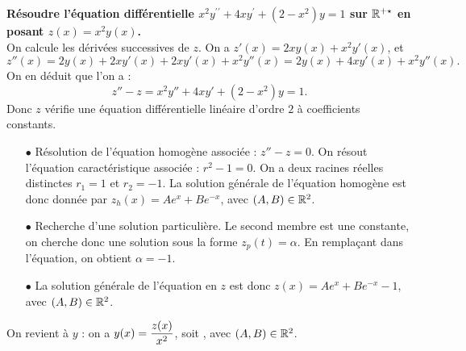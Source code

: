 \documentclass[a4paper, 11pt,reqno]{article}
\begin{document}
\begin{correction}  \;
\textbf{R\'esoudre l'\'equation diff\'erentielle $x^2y^{\prime\prime}+4xy^{\prime}+(2-x^2)y=1$ sur $\mathbb{R}^{+\star}$ en posant $z(x)=x^2y(x)$.}\\
On calcule les d\'eriv\'ees successives de $z$. On a $z'(x) = 2x y(x) + x^2 y'(x)$, et 
$$z''(x) = 2 y(x) + 2x y'(x) + 2x y'(x) + x^2 y''(x) = 2 y(x) + 4x y'(x) + x^2y''(x).$$ 
On en d\'eduit que l'on a :
$$z''-z =  x^2 y'' +4x y' + (2-x^2)y = 1.$$
Donc $z$ v\'erifie une \'equation diff\'erentielle lin\'eaire d'ordre $2$ \`a coefficients constants.
\begin{itemize}
\item[$\bullet$] R\'esolution de l'\'equation homog\`ene associ\'ee : $z''-z =0$. On r\'esout l'\'equation caract\'eristique associ\'ee : $r^2-1=0$. On a deux racines r\'eelles distinctes $r_1=1$ et $r_2=-1$. La solution g\'en\'erale de l'\'equation homog\`ene est donc donn\'ee par $z_h(x) = Ae^{x} + B e^{-x}$, avec $(A,B) \in \mathbb{R}^2$.
\item[$\bullet$] Recherche d'une solution particuli\`ere. Le second membre est une constante, on cherche donc une solution sous la forme $z_p(t) = \alpha$. En rempla\c cant dans l'\'equation, on obtient $\alpha=-1$.
\item[$\bullet$] La solution g\'en\'erale de l'\'equation en $z$ est donc $z(x) = Ae^{x} + B e^{-x} -1$, avec $(A,B) \in \mathbb{R}^2$.
\end{itemize}
On revient \`a $y$ : on a $y(x) = \displaystyle \frac{z(x)}{x^2}$, soit  , avec $(A,B) \in \mathbb{R}^2$.
\end{correction}
\end{document}
